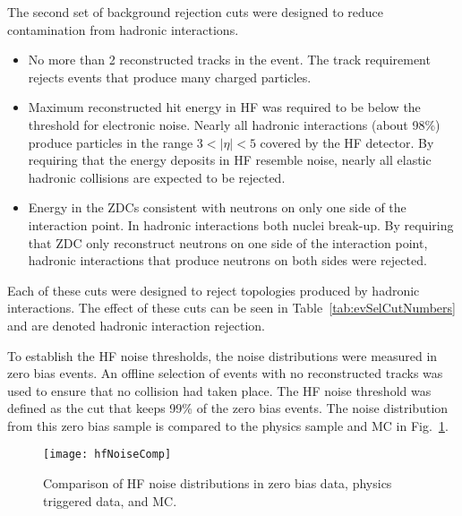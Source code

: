       The second set of background rejection cuts were designed to 
        reduce contamination from hadronic interactions. 
      \begin{itemize}
  	    \item No more than 2 reconstructed tracks in the event.
          The track requirement rejects events that produce many charged 
          particles.
  	    \item Maximum reconstructed hit energy in HF was required to be below 
            the threshold for electronic noise. 
          Nearly all hadronic interactions (about 98\%) produce particles in 
            the range $3<|\eta|<5$ covered by the HF detector.
          By requiring that the energy deposits in HF resemble noise, nearly all
            elastic hadronic collisions are expected to be rejected.
  	    \item Energy in the ZDCs consistent with neutrons on only one side 
            of the interaction point.
          In hadronic interactions both nuclei break-up. 
          By requiring that ZDC only reconstruct neutrons on one side of the 
            interaction point, hadronic interactions that produce neutrons on 
            both sides were rejected.
      \end{itemize}
      Each of these cuts were designed to reject topologies produced by 
        hadronic interactions.
      The effect of these cuts can be seen in Table~\ref{tab:evSelCutNumbers} 
        and are denoted hadronic interaction rejection. 

      To establish the HF noise thresholds, the noise distributions were 
        measured in zero bias events. 
      An offline selection of events with no reconstructed tracks was used
        to ensure that no collision had taken place. 
      The HF noise threshold was defined as the cut that keeps 99\% of the 
        zero bias events.
      The noise distribution from this zero bias sample is compared to the 
        physics sample and MC in Fig.~\ref{fig:hfNoiseDist}.

      \begin{figure}[!Hhbt]
        \centering
        \texttt{[image: hfNoiseComp]}
        \caption{Comparison of HF noise distributions in zero bias data, 
          physics triggered data, and MC.}
        \label{fig:hfNoiseDist}
      \end{figure}

